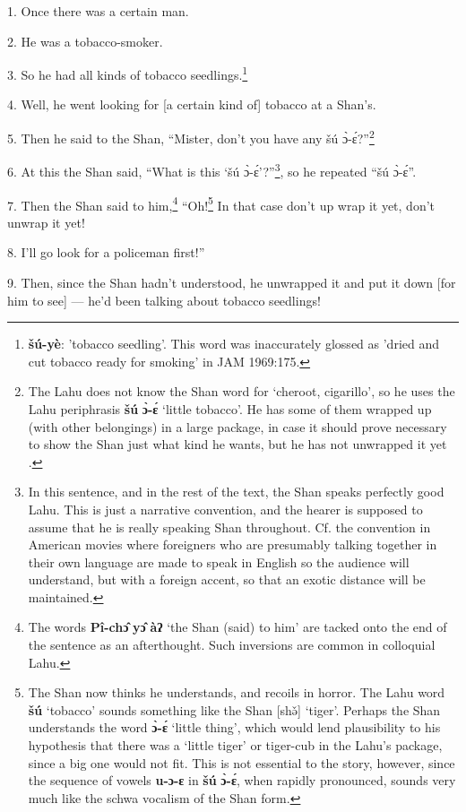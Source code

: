 \setcounter{footnote}{0}

1. Once there was a certain man.

2. He was a tobacco-smoker.

3. So he had all kinds of tobacco seedlings.\footnote{\textbf{šú-yè}: 'tobacco seedling'. This word was inaccurately glossed as 'dried and cut tobacco ready for smoking' in JAM 1969:175.}

4. Well, he went looking for [a certain kind of] tobacco at a Shan's.

5. Then he said to the Shan, ``Mister, don't you have any šú ɔ̀-ɛ́?''\footnote{The Lahu does not know the Shan word for `cheroot, cigarillo', so he uses the Lahu periphrasis \textbf{šú} \textbf{ɔ̀-ɛ́} `little tobacco'. He has some of them wrapped up (with other belongings) in a large package, in case it should prove necessary to show the Shan just what kind he wants, but he has not unwrapped it yet .}

6. At this the Shan said, ``What is this `šú ɔ̀-ɛ́'?''\footnote{In this sentence, and in the rest of the text, the Shan speaks perfectly good Lahu. This is just a narrative convention, and the hearer is supposed to assume that he is really speaking Shan throughout. Cf. the convention in American movies where foreigners who are presumably talking together in their own language are made to speak in English so the audience will understand, but with a foreign accent, so that an exotic distance will be maintained.}, so he repeated
``šú ɔ̀-ɛ́''.

7. Then the Shan said to him,\footnote{The words \textbf{Pî-chɔ̂} \textbf{yɔ̂} \textbf{àʔ} `the Shan (said) to him' are tacked onto the end of the sentence as an afterthought. Such inversions are common in colloquial Lahu.} ``Oh!\footnote{The Shan now thinks he understands, and recoils in horror. The Lahu word \textbf{šú} `tobacco' sounds something like the Shan [shə̌] `tiger'. Perhaps the Shan understands the word \textbf{ɔ̀-ɛ́} `little thing', which would lend plausibility to his hypothesis that there was a `little tiger' or tiger-cub in the Lahu's package, since a big one would not fit. This is not essential to the story, however, since the sequence of vowels \textbf{u-ɔ-ɛ} in \textbf{šú} \textbf{ɔ̀-ɛ́}, when rapidly pronounced, sounds very much like the schwa vocalism of the Shan form.} In that case don't up wrap it yet, don't
unwrap it yet!

8. I'll go look for a policeman first!''

9. Then, since the Shan hadn't understood, he unwrapped it and put it down [for
him to see] --- he'd been talking about tobacco seedlings!

